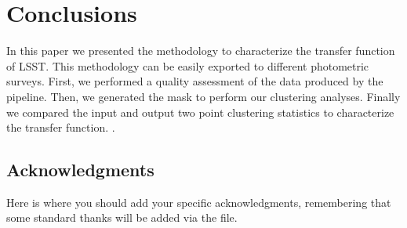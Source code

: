 \documentclass[\docopts]{\docclass}
\begin{document}

\section{Conclusions}
\label{sec:conclusions}

In this paper we presented the methodology to characterize the transfer function of LSST. This methodology can be easily exported to different photometric surveys. First, we performed a quality assessment of the data produced by the pipeline. Then, we generated the mask to perform our clustering analyses. Finally we compared the input and output two point clustering statistics to characterize the transfer function. .



\subsection*{Acknowledgments}

Here is where you should add your specific acknowledgments, remembering that some standard thanks will be added via the  file.






\appendix
\end{document}

